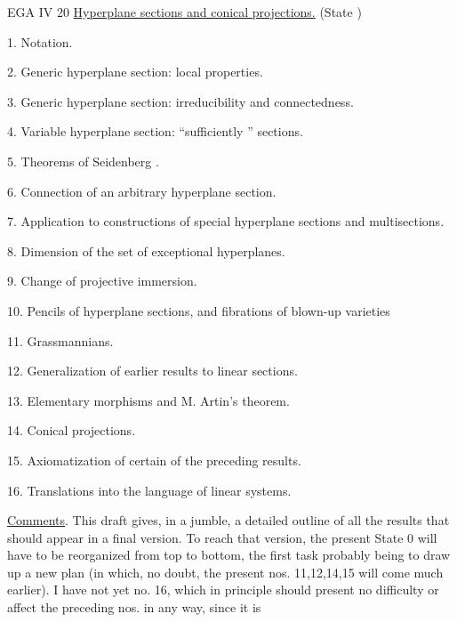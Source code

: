  

EGA IV 20 \quad \uline{Hyperplane sections and conical projections.} (State )

1. Notation.

2. Generic hyperplane section: local properties.

3. Generic hyperplane section:  irreducibility and connectedness.

4. Variable hyperplane section: ``sufficiently '' sections.

5. Theorems of Seidenberg .

6. Connection of an arbitrary hyperplane section.

7. Application to constructions of special hyperplane sections and multisections.

8. Dimension of the set of exceptional hyperplanes.

9. Change of projective immersion.

10. Pencils of hyperplane sections, and fibrations of blown-up varieties

11. Grassmannians.

12. Generalization of earlier results to linear sections.

13. Elementary morphisms and M. Artin's theorem.

14. Conical projections.

15. Axiomatization of certain of the preceding results.

16. Translations into the language of linear systems.

\uline{Comments}. This draft gives, in a jumble, a detailed outline
of all the results that should appear in a final
version. To reach that version, the present State 0 will have to be reorganized
from top to bottom, the first task probably being
to draw up a new plan (in which, no doubt, the present
nos. 11,12,14,15 will come much earlier). I have not yet 
no. 16, which in principle should present no difficulty or
affect the preceding nos. in any way, since it is 

